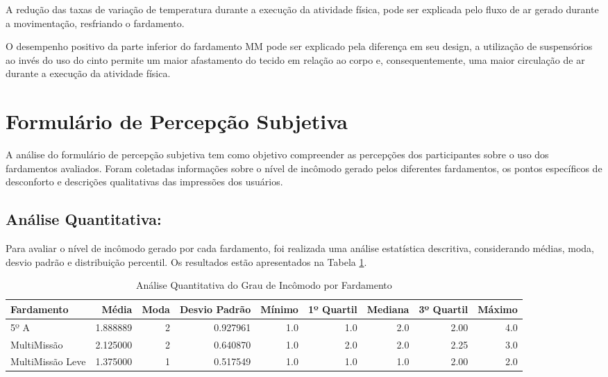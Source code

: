         A redução das taxas de variação de temperatura durante a execução da atividade física, 
        pode ser explicada pelo fluxo de ar gerado durante a movimentação, resfriando o fardamento.

        O desempenho positivo da parte inferior do fardamento \acrshort{MM} pode ser explicado pela 
        diferença em seu design, a utilização de suspensórios ao invés do uso do cinto permite um maior 
        afastamento do tecido em relação ao corpo e, consequentemente, uma maior circulação de ar 
        durante a execução da atividade física.


\section{Formulário de Percepção Subjetiva}
    A análise do formulário de percepção subjetiva tem como objetivo compreender as percepções dos 
    participantes sobre o uso dos fardamentos avaliados. Foram coletadas informações sobre o nível de 
    incômodo gerado pelos diferentes fardamentos, os pontos específicos de desconforto e descrições 
    qualitativas das impressões dos usuários.

    \subsection{Análise Quantitativa:}
        
        Para avaliar o nível de incômodo gerado por cada fardamento, foi realizada uma análise 
        estatística descritiva, considerando médias, moda, desvio padrão e distribuição percentil. Os resultados 
        estão apresentados na Tabela \ref{tab:analise_fardamento}.
        \begin{table}[H]
                \centering
                \caption{Análise Quantitativa do Grau de Incômodo por Fardamento}
                \label{tab:analise_fardamento}
                \footnotesize
                \begin{tabular}{lrrrrrrrr}
                \toprule
                Fardamento &     Média &  Moda &  Desvio Padrão &  Mínimo &  1º Quartil &  Mediana &  3º Quartil &  Máximo \\
                \midrule
                5º A             &  1.888889 &     2 &       0.927961 &     1.0 &         1.0 &      2.0 &        2.00 &     4.0 \\
                MultiMissão      &  2.125000 &     2 &       0.640870 &     1.0 &         2.0 &      2.0 &        2.25 &     3.0 \\
                MultiMissão Leve &  1.375000 &     1 &       0.517549 &     1.0 &         1.0 &      1.0 &        2.00 &     2.0 \\
                \bottomrule
                \end{tabular}
                \end{table}
    

